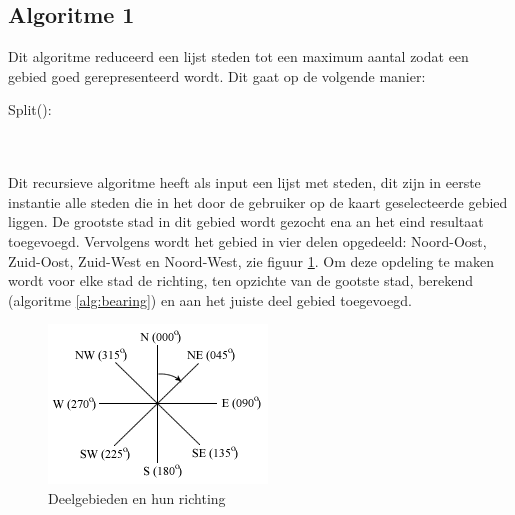 \documentclass[twoside,openright]{uva-bachelor-thesis}
\begin{document}
		\subsection{Algoritme 1}
			Dit algoritme reduceerd een lijst steden tot een maximum aantal zodat een gebied goed gerepresenteerd wordt. Dit gaat op de volgende manier:
			\begin{algorithm}
				\caption{Algortime 1 voor gebiedsrepresentatie}
				\mbox{Split():}\\[0.5cm]
				\mbox{}\\
			\end{algorithm}\\[0.5cm]
			Dit recursieve algoritme heeft als input een lijst met steden, dit zijn in eerste instantie alle steden die in het door de gebruiker op de kaart geselecteerde gebied liggen. De grootste stad in dit gebied wordt gezocht ena an het eind resultaat toegevoegd. Vervolgens wordt het gebied in vier delen opgedeeld: Noord-Oost, Zuid-Oost, Zuid-West en Noord-West, zie figuur \ref{fig:bearing}. Om deze opdeling te maken wordt voor elke stad de richting, ten opzichte van de gootste stad, berekend (algoritme \ref{alg:bearing}) en aan het juiste deel gebied toegevoegd.
			\begin{figure}[!htb]
				\centering
				\includegraphics[scale=1.0]{./img/bearings.png}
				\caption{Deelgebieden en hun richting}
				\label{fig:bearing}
			\end{figure}
\end{document}

